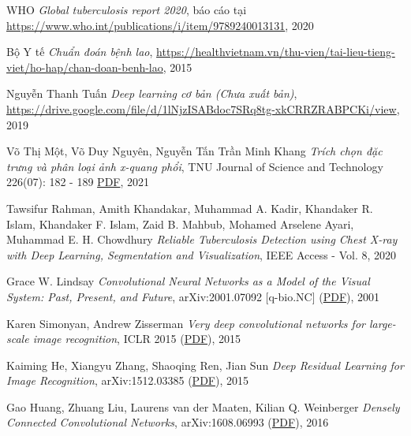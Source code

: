 \newpage
{}
\begin{thebibliography}{99}
	 WHO {\it Global tuberculosis report 2020}, báo cáo tại \href{https://www.who.int/publications/i/item/9789240013131}{ https://www.who.int/publications/i/item/9789240013131}, 2020
	
	 Bộ Y tế {\it Chuẩn đoán bệnh lao}, \href{https://healthvietnam.vn/thu-vien/tai-lieu-tieng-viet/ho-hap/chan-doan-benh-lao}{https://healthvietnam.vn/thu-vien/tai-lieu-tieng-viet/ho-hap/chan-doan-benh-lao}, 2015
	
	
	 Nguyễn Thanh Tuấn {\it Deep learning cơ bản (Chưa xuất bản)}, \href{https://drive.google.com/file/d/1lNjzISABdoc7SRq8tg-xkCRRZRABPCKi/view}{https://drive.google.com/file/d/1lNjzISABdoc7SRq8tg-xkCRRZRABPCKi/view}, 2019
	
	 Võ Thị Một, Võ Duy Nguyên, Nguyễn Tấn Trần Minh Khang {\it Trích chọn đặc trưng và phân loại ảnh x-quang phổi}, TNU Journal of Science and Technology 226(07): 182 - 189 {\href{http://jst.tnu.edu.vn/jst/article/viewFile/3974/pdf}{PDF}}, 2021
	
	 Tawsifur Rahman, Amith Khandakar, Muhammad A. Kadir, Khandaker R. Islam, Khandaker F. Islam, Zaid B. Mahbub, Mohamed Arselene Ayari, Muhammad E. H. Chowdhury {\it Reliable Tuberculosis Detection using Chest X-ray with Deep Learning, Segmentation and Visualization}, IEEE Access - Vol. 8, 2020
	
	 Grace W. Lindsay {\it Convolutional Neural Networks as a Model of the Visual System: Past, Present, and Future}, 	arXiv:2001.07092 [q-bio.NC] (\href{https://arxiv.org/ftp/arxiv/papers/2001/2001.07092.pdf}{PDF}), 2001
	
	 Karen Simonyan, Andrew Zisserman {\it Very deep convolutional networks for large-scale image recognition}, ICLR 2015 (\href{https://arxiv.org/pdf/1409.1556.pdf}{PDF}), 2015
	
	 Kaiming He, Xiangyu Zhang, Shaoqing Ren, Jian Sun {\it Deep Residual Learning for Image Recognition}, arXiv:1512.03385 (\href{https://arxiv.org/pdf/1512.03385.pdf}{PDF}), 2015	
	
	 Gao Huang, Zhuang Liu, Laurens van der Maaten, Kilian Q. Weinberger {\it Densely Connected Convolutional Networks}, arXiv:1608.06993 (\href{https://arxiv.org/pdf/1608.06993.pdf}{PDF}), 2016 
	  
\end{thebibliography}
